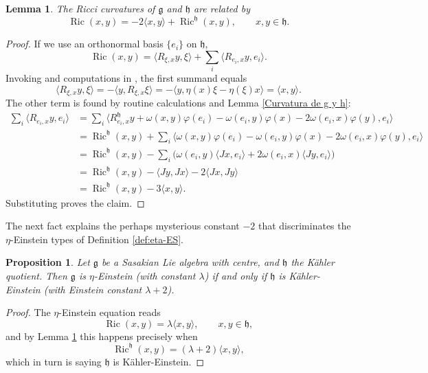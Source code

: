 \documentclass[12pt, twoside]{amsart}
\def\g{\mathfrak{g}}
\def\h{\mathfrak{h}}
\def\ric{\operatorname{Ric}}
\newtheorem{prop}[definition]{Proposition}
\newtheorem{lemma}[definition]{Lemma}
\theoremstyle{definition}
\begin{document}
\begin{lemma}\label{Ric g y Ric h}
The Ricci curvatures of $\g$ and $\h$ are related by
\[\ric(x,y)=-2\langle  x, y \rangle + \ric^{\h}(x,y), \qquad x,y \in \h.\]
\end{lemma}
\begin{proof} If we use an orthonormal basis  $\{e_i\}$  on  $\h$, 
$$
    \ric(x,y)=\langle R_{\xi,x}y,\xi \rangle + {\textstyle\sum}_i\langle R_{e_i,x}y,e_i\rangle.
$$
Invoking \cite[Lemma 2.2 (iii)]{to} and computations in \cite [Section 2]{AFV},    the first summand equals 
$$
   \langle R_{\xi,x}y , \xi \rangle = -\langle y, R_{\xi,x}\xi \rangle
    =-\langle y , \eta(x)\xi-\eta(\xi)x \rangle  
    = \langle x ,y \rangle. 
$$
The other term is found by routine calculations and Lemma \ref{Curvatura de g y h}:
\begin{equation*}\begin{split}
    {\textstyle\sum}_i\langle R_{e_i,x}y,e_i\rangle&=
    {\textstyle\sum}_i \langle R^{\h}_{e_i,x}y+\omega(x,y)\varphi(e_i)-\omega(e_i,y)\varphi(x)-2\omega(e_i,x)\varphi(y),e_i\rangle \\
    &=\ric^{\h}(x,y)+ {\textstyle\sum}_i \langle \omega(x,y)\varphi(e_i)-\omega(e_i,y)\varphi(x)-2\omega(e_i,x)\varphi(y),e_i\rangle \\
    &=\ric^{\h}(x,y)- {\textstyle\sum}_i \big(\omega(e_i,y)\langle Jx,e_i\rangle+2\omega(e_i,x)\langle Jy,e_i \rangle \big) \\
    &=\ric^{\h}(x,y)-\langle Jy,Jx \rangle - 2 \langle Jx,Jy\rangle \\
    &=\ric^{\h}(x,y)-3\langle x,y \rangle.
\end{split}\end{equation*}
Substituting proves the claim. 
\end{proof}

The next fact explains the perhaps mysterious constant $-2$ that  discriminates the $\eta$-Einstein types of Definition \ref{def:eta-ES}.

\begin{prop}\label{prop: einstein con centro}
Let $\g$ be a Sasakian Lie algebra with centre, and $\h$ the K\"ahler quotient. Then $\g$ is $\eta$-Einstein (with constant $\lambda$) 
if and only if $\h$ is K{\"a}hler-Einstein (with Einstein constant $\lambda +2$).
\end{prop}

\begin{proof}
The $\eta$-Einstein equation reads 
\[\ric(x,y)=\lambda\langle x, y \rangle, \qquad x,y \in \h,\]
and by Lemma \ref{Ric g y Ric h} this happens precisely when 
\[ \ric^{\h}(x,y)=(\lambda+2)\langle x , y \rangle, \]
which in turn is saying $\h$ is K{\"a}hler-Einstein.
\end{proof}
\end{document}

